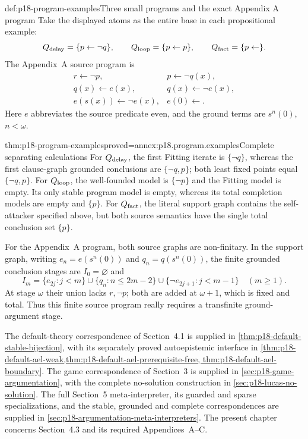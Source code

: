 \begin{hbdefinition}{def:p18-program-examples}{Three small programs and the exact Appendix A program}
Take the displayed atoms as the entire
base in each propositional example:
\[
 Q_{\rm delay}=\{p\leftarrow\neg q\},\qquad
 Q_{\rm loop}=\{p\leftarrow p\},\qquad
 Q_{\rm fact}=\{p\leftarrow\}.
\]
The Appendix~A source program is
\[
\begin{array}{ll}
 r\leftarrow\neg p,&p\leftarrow\neg q(x),\\
 q(x)\leftarrow e(x),&q(x)\leftarrow\neg e(x),\\
 e(s(x))\leftarrow\neg e(x),&e(0)\leftarrow.
\end{array}
\]
Here \(e\) abbreviates the source predicate
\(\mathrm{even}\), and the ground terms
are \(s^n(0)\), \(n<\omega\).
\end{hbdefinition}

\begin{hbtheorem}{thm:p18-program-examples}{proved=annex:p18.program.examples}{Complete separating calculations}
For \(Q_{\rm delay}\), the first Fitting
iterate is \(\{\neg q\}\), whereas the
first clause-graph grounded conclusions
are \(\{\neg q,p\}\); both least fixed
points equal \(\{\neg q,p\}\).
For \(Q_{\rm loop}\), the well-founded
model is \(\{\neg p\}\) and the Fitting
model is empty. Its only stable program
model is empty, whereas its total
completion models are empty and \(\{p\}\).
For \(Q_{\rm fact}\), the literal
support graph contains the self-attacker
specified above, but both source
semantics have the single total
conclusion set \(\{p\}\).

For the Appendix~A program, both source
graphs are non-finitary. In the support
graph, writing \(e_n=e(s^n(0))\) and
\(q_n=q(s^n(0))\), the finite grounded
conclusion stages are \(I_0=\varnothing\) and
\[
 I_m=\{e_{2j}:j<m\}\cup\{q_n:n\leq2m-2\}
               \cup\{\neg e_{2j+1}:j<m-1\}\quad(m\geq1).
\]
At stage \(\omega\) their union lacks
\(r,\neg p\); both are added at
\(\omega+1\), which is fixed and total.
Thus this finite source program really
requires a transfinite ground-argument
stage.
\end{hbtheorem}

The default-theory correspondence of Section~4.1 is supplied in
\cref{thm:p18-default-stable-bijection}, with its separately proved
autoepistemic interface in
\cref{thm:p18-default-ael-weak,thm:p18-default-ael-prerequisite-free,
thm:p18-default-ael-boundary}.
The game correspondence of Section~3 is supplied in
\cref{sec:p18-game-argumentation}, with the complete no-solution
construction in \cref{sec:p18-lucas-no-solution}.
The full Section~5 meta-interpreter, its guarded and sparse
specializations, and the stable, grounded and complete correspondences
are supplied in \cref{sec:p18-argumentation-meta-interpreters}. The present
chapter concerns Section~4.3 and its
required Appendices~A--C.
